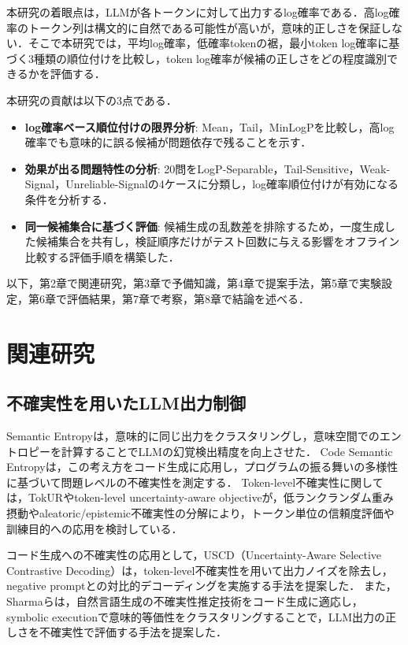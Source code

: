 \documentclass[submit,techrep,noauthor]{ipsj}
\begin{document}
本研究の着眼点は，LLMが各トークンに対して出力するlog確率である．高log確率のトークン列は構文的に自然である可能性が高いが，意味的正しさを保証しない．そこで本研究では，平均log確率，低確率tokenの裾，最小token log確率に基づく3種類の順位付けを比較し，token log確率が候補の正しさをどの程度識別できるかを評価する．

本研究の貢献は以下の3点である．
\begin{itemize}
\item \textbf{log確率ベース順位付けの限界分析}: Mean，Tail，MinLogPを比較し，高log確率でも意味的に誤る候補が問題依存で残ることを示す．
\item \textbf{効果が出る問題特性の分析}: 20問をLogP-Separable，Tail-Sensitive，Weak-Signal，Unreliable-Signalの4ケースに分類し，log確率順位付けが有効になる条件を分析する．
\item \textbf{同一候補集合に基づく評価}: 候補生成の乱数差を排除するため，一度生成した候補集合を共有し，検証順序だけがテスト回数に与える影響をオフライン比較する評価手順を構築した．
\end{itemize}

以下，第2章で関連研究，第3章で予備知識，第4章で提案手法，第5章で実験設定，第6章で評価結果，第7章で考察，第8章で結論を述べる．

\section{関連研究}

\subsection{不確実性を用いたLLM出力制御}

Semantic Entropy\cite{semantic_entropy2024}は，意味的に同じ出力をクラスタリングし，意味空間でのエントロピーを計算することでLLMの幻覚検出精度を向上させた．
Code Semantic Entropy\cite{code_semantic_entropy2026}は，この考え方をコード生成に応用し，プログラムの振る舞いの多様性に基づいて問題レベルの不確実性を測定する．
Token-level不確実性に関しては，TokUR\cite{tokur2025}やtoken-level uncertainty-aware objective\cite{token_uq_training2025}が，低ランクランダム重み摂動やaleatoric/epistemic不確実性の分解により，トークン単位の信頼度評価や訓練目的への応用を検討している．

コード生成への不確実性の応用として，USCD（Uncertainty-Aware Selective Contrastive Decoding）\cite{uscd2024}は，token-level不確実性を用いて出力ノイズを除去し，negative promptとの対比的デコーディングを実施する手法を提案した．
また，Sharmaら\cite{assess_correctness2025}は，自然言語生成の不確実性推定技術をコード生成に適応し，symbolic executionで意味的等価性をクラスタリングすることで，LLM出力の正しさを不確実性で評価する手法を提案した．
\end{document}
